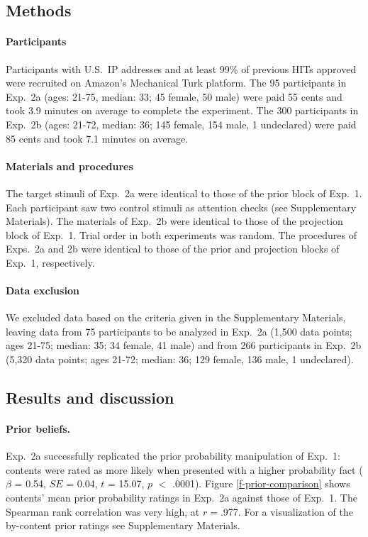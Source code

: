 \documentclass[OpenMind]{stjour}
\begin{document}
\subsection{Methods}


\paragraph{Participants} Participants with U.S.\ IP addresses and at least 99\% of previous HITs approved were recruited on Amazon's Mechanical Turk platform. The 95 participants in Exp.~2a (ages: 21-75, median: 33; 45 female, 50 male) were paid 55 cents and took 3.9 minutes on average to complete the experiment. The 300 participants in Exp.~2b (ages: 21-72, median: 36; 145 female, 154 male, 1 undeclared) were paid 85 cents and took 7.1 minutes on average.

\paragraph{Materials and procedures} The target stimuli of Exp.~2a were identical to those of the prior block of Exp.~1. Each participant saw two control stimuli as attention checks (see Supplementary Materials). The materials of Exp.~2b were identical to those of the projection block of Exp.~1. Trial order in both experiments was random. The procedures of Exps.~2a and 2b were identical to those of the prior and projection blocks of Exp.~1, respectively.

\paragraph{Data exclusion} We excluded data based on the criteria given in the Supplementary Materials, leaving data from 75 participants to be analyzed in Exp.~2a (1,500 data points; ages 21-75; median: 35; 34 female, 41 male) and from 266 participants in Exp.~2b (5,320 data points; ages 21-72; median: 36; 129 female, 136 male, 1 undeclared).

\subsection{Results and discussion}

\paragraph{Prior beliefs.} Exp.~2a successfully replicated the prior probability manipulation of Exp.~1: contents were rated as more likely when presented with a higher probability fact ($\beta$ = 0.54, $SE$ = 0.04, $t$ = 15.07, $p$ $<$ .0001).  Figure \ref{f-prior-comparison} shows contents' mean prior probability ratings in Exp.~2a against those of Exp.~1. The Spearman rank correlation was very high, at $r=$.977. For a visualization of the by-content prior ratings see Supplementary Materials.
\end{document}
